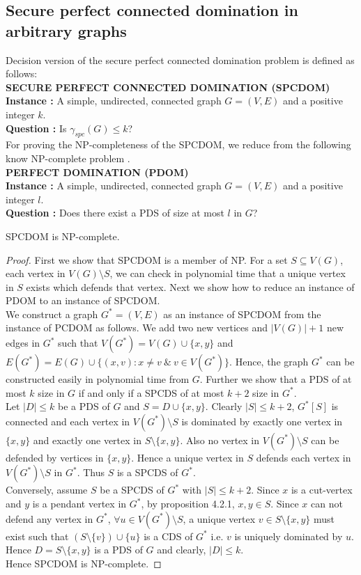 \subsection{Secure perfect connected domination in arbitrary graphs}
\noindent
\noindent Decision version of the secure perfect connected domination problem is defined as follows:\\
\textbf{SECURE PERFECT CONNECTED DOMINATION (SPCDOM)}\\
\indent \textbf{Instance :} A simple, undirected, connected graph $G=(V,E)$ and a positive integer $k$.\\
\indent \textbf{Question :} Is $\gamma_{spc}(G) \leq k$?\\
For proving the NP-completeness of the SPCDOM, we reduce from the following know NP-complete problem \cite{Yen}.\\
\textbf{PERFECT DOMINATION (PDOM)}\\
\indent \textbf{Instance :} A simple, undirected, connected graph $G=(V,E)$ and a positive integer $l$.\\
\indent \textbf{Question :} Does there exist a PDS of size at most $l$ in $G$?
\begin{theorem}
SPCDOM is NP-complete.
\end{theorem}
\begin{proof}
First we show that SPCDOM is a member of NP. For a set $S \subseteq V(G)$, each vertex in $V(G) \setminus S$, we can check in polynomial time that a unique vertex in $S$ exists which defends that vertex. Next we show how to reduce an instance of PDOM to an instance of SPCDOM.\smallskip \\ 
We construct a graph $G^*=(V,E)$ as an instance of SPCDOM from the instance of PCDOM as follows. We add two new vertices and $|V(G)|+1$ new edges in $G^*$ such that $V(G^*)=V(G) \cup \lbrace x,y \rbrace$ and  $E(G^*)=E(G) \cup \lbrace (x,v):x \neq v ~\&~v \in V(G^*) \rbrace$. Hence, the graph $G^*$ can be constructed easily in polynomial time from $G$. Further we show that a PDS of at most $k$ size in $G$ if and only if a SPCDS of at most $k+2$ size in $G^*$.\\
Let $|D| \leq k$ be a PDS of $G$ and $S=D \cup \lbrace x,y \rbrace$. Clearly $|S| \leq k+2$, $G^*[S]$ is connected and each vertex in $ V(G^*) \setminus S$ is dominated by exactly one vertex in $\{x,y\}$ and exactly one vertex in $S \setminus \{x,y\}$. Also no vertex in $V(G^*) \setminus S$ can be defended by vertices in $\{x,y\}$. Hence a unique vertex in $S$ defends each vertex in $ V(G^*)\setminus S$ in $G^*$. Thus $S$ is a SPCDS of $G^*$.\\
Conversely, assume $S$ be a SPCDS of $G^*$ with $|S| \leq k+2$. Since $x$ is a cut-vertex and $y$ is a pendant vertex in $G^*$, by proposition 4.2.1, $x,y \in S$. Since $x$ can not defend any vertex in $G^*$, $\forall u \in V(G^*)\setminus S$, a unique vertex $v \in S\setminus \lbrace x,y \rbrace $ must exist such that $(S \setminus \lbrace v \rbrace) \cup \lbrace u \rbrace$ is a CDS of $G^*$ i.e. $v$ is uniquely dominated by $u$. Hence $D = S \setminus \lbrace x,y \rbrace$ is a PDS of $G$ and clearly, $|D| \leq k$.\\
Hence SPCDOM is NP-complete.
\end{proof}
